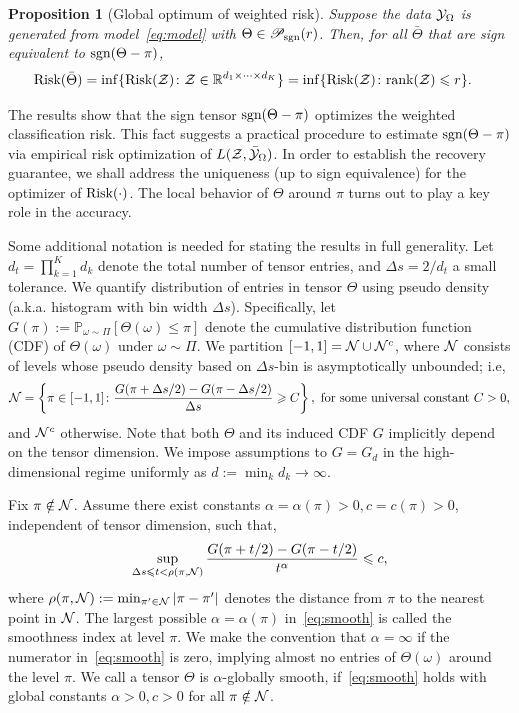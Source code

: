 \documentclass[useAMS,usenatbib,usegraphicx,referee]{biom}
\theoremstyle{plain}
\newtheorem{prop}{Proposition}
\theoremstyle{definition}
\def\sign{\textup{sgn}}
\def\caliP{\mathscr{P}_{\textup{sgn}}}
\def\risk{\textup{Risk}}
\begin{document}
\begin{prop}[Global optimum of weighted risk]\label{prop:global}
Suppose the data $\mathcal{Y}_\Omega$ is generated from model~\eqref{eq:model} with $\Theta \in \caliP(r)$. Then, for all $\bar \Theta$ that are sign equivalent to $\sign(\Theta-\pi)$, 
\begin{align}\label{eq:optimal}
\textup{Risk}(\bar \Theta )&=\inf\{\textup{Risk}(\tZ)\colon \tZ\in\mathbb{R}^{d_1\times \cdots \times d_K}\}
=\inf\{\textup{Risk}(\tZ)\colon \textup{rank} (\tZ)\leq r\}.
\end{align}
\end{prop}
The results show that the sign tensor $\sign(\Theta-\pi)$ optimizes the weighted classification risk. This fact suggests a practical procedure to estimate $\sign(\Theta-\pi)$ via empirical risk optimization of $L(\mathcal{Z},\bar {\mathcal{Y}}_\Omega)$. In order to establish the recovery guarantee, we shall address the uniqueness (up to sign equivalence) for the optimizer of $\risk(\cdot)$. The local behavior of $\Theta$ around $\pi$ turns out to play a key role in the accuracy. 

Some additional notation is needed for stating the results in full generality. Let $d_t=\prod^K_{k=1} d_k$ denote the total number of tensor entries, and $\Delta s = 2/d_t$ a small tolerance. We quantify distribution of entries in tensor $\Theta$ using pseudo density (a.k.a. histogram with bin width $\Delta s$). Specifically, let $G(\pi):=\mathbb{P}_{\omega\sim \Pi}[\Theta(\omega)\leq \pi]$ denote the cumulative distribution function (CDF) of $\Theta(\omega)$ under $\omega\sim \Pi$. We partition $[-1,1]=\mathcal{N} \cup \mathcal{N}^c$, where $\mathcal{N}$ consists of levels whose pseudo density based on $\Delta s$-bin is asymptotically unbounded; i.e,
\[
\mathcal{N}=\left\{\pi\in[-1,1] \colon {G(\pi+{\Delta s/2})-G(\pi-{\Delta s/2})\over \Delta s} \geqslant C \right\},\ \text{for some universal constant }C>0,
\]
and $\mathcal{N}^c$ otherwise. 
Note that both $\Theta$ and its induced CDF $G$ implicitly depend on the tensor dimension. We impose assumptions to $G=G_d$ in the high-dimensional regime uniformly as $d:=\min_k d_k \to\infty$. 

\begin{assumption}\label{ass:margin} Fix $\pi \notin \mathcal{N}$. Assume there exist constants $\alpha=\alpha(\pi)> 0, c=c(\pi) >0$, independent of tensor dimension, such that, 
\begin{equation}\label{eq:smooth}
\sup_{\Delta s \leq t<\rho(\pi, \tN)}{G(\pi+{t/2})-G(\pi-{t/2})\over t^\alpha} \leq c,
\end{equation}
where $\rho(\pi,\mathcal{N}):=\min_{\pi'\in \mathcal{N}}|\pi-\pi'|$ denotes the distance from $\pi$ to the nearest point in $\mathcal{N}$. The largest possible $\alpha=\alpha(\pi)$ in~\eqref{eq:smooth} is called the smoothness index at level $\pi$. We make the convention that $\alpha=\infty$ if the numerator in~\eqref{eq:smooth} is zero, implying almost no entries of $\Theta(\omega)$ around the level $\pi$. We call a tensor $\Theta$ is $\alpha$-globally smooth, if~\eqref{eq:smooth} holds with global constants $\alpha>0, c>0$ for all $\pi\notin\mathcal{N}$. 
\end{assumption}
\end{document}
